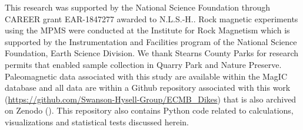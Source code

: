 \documentclass[draft]{agujournal2019}
\begin{document}


%
%
%
%
%
%
%
%


\acknowledgments
This research was supported by the National Science Foundation through CAREER grant EAR-1847277 awarded to N.L.S.-H.. Rock magnetic experiments using the MPMS were conducted at the Institute for Rock Magnetism which is supported by the Instrumentation and Facilities program of the National Science Foundation, Earth Science Division. We thank Stearns County Parks for research permits that enabled sample collection in Quarry Park and Nature Preserve. Paleomagnetic data associated with this study are available within the MagIC database and all data are within a Github repository associated with this work (\url{https://github.com/Swanson-Hysell-Group/ECMB_Dikes}) that is also archived on Zenodo (). This repository also contains Python code related to calculations, visualizations and statistical tests discussed herein.  


%
%
\end{document}
